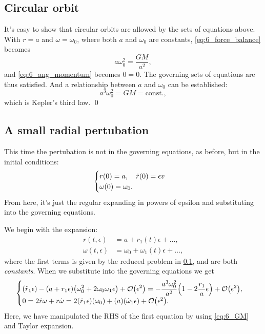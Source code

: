 \documentclass[11pt,letter, swedish, english
]{article}
\begin{document}
\subsection{Circular orbit}\label{sec:6a}
It's easy to show that circular orbits are allowed by the sets of
equations above. With $r=a$ and $\omega=\omega_0$, where both $a$ and
$\omega_0$ are constants, \eqref{eq:6_force_balance} becomes
\begin{equation}
a\omega_0^2=\frac{GM}{a^2},
\end{equation}
and \eqref{eq:6_ang_momentum} becomes $0=0$. The governing sets of
equations are thus satisfied. And a relationship between $a$ and
$\omega_0$ can be established:
\begin{equation}\label{eq:6_GM}
a^3 \omega_0^2 = GM = \text{const.},
\end{equation}
which is Kepler's third law.
\qed

\subsection{A small radial pertubation}
This time the pertubation is not in the governing equations, as
before, but in the initial conditions\footnotemark{}:
\begin{equation}
\begin{cases}
r(0)=a\qcomma \dot{r}(0) = \epsilon v\\
\omega(0)=\omega_0.
\end{cases}
\end{equation}
From here, it's just the regular expanding in powers of epsilon and
substituting into the governing equations.

We begin with the expansion:
\begin{equation}
\begin{aligned}
r(t, \epsilon) &= a + r_1(t)\epsilon +\ldots,\\
\omega(t, \epsilon) &= \omega_0 + \omega_1(t)\epsilon + \ldots,
\end{aligned}
\end{equation}
where the first terms is given by the reduced problem in \ref{sec:6a},
and are both \emph{constants}.
When we substitute into the governing equations we get
\begin{equation}\label{eq:6_ODE}
\begin{cases}\displaystyle
(\ddot{r}_1\epsilon) 
- (a+r_1\epsilon)\qty(\omega_0^2+2\omega_0\omega_1\epsilon)
+\order{\epsilon^2}
= -\frac{a^3\omega_0^2}{a^2}\qty(1-2\frac{r_1}{a}\epsilon)
+\order{\epsilon^2},\\
0=2\dot{r}\omega + r\dot{\omega} =
2\qty(\dot{r}_1\epsilon)(\omega_0)
+ (a)(\dot{\omega}_1\epsilon)+\order{\epsilon^2}.
\end{cases}
\end{equation}
Here, we have manipulated the RHS of the first equation by using
\eqref{eq:6_GM} and Taylor expansion. 
\end{document}
